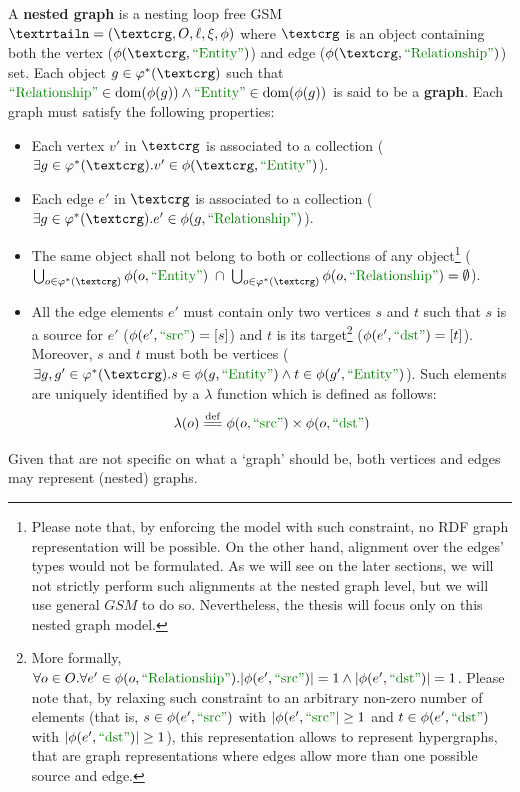 \begin{definition}
	A \textbf{nested graph} is a nesting loop free GSM $\fullnested$  where $\ngraph$ is an object containing both the vertex ($\phi(\ngraph,\ONTA)$) and edge ($\phi(\ngraph,\RELA)$) set. Each object $g\in \varphi^*(\ngraph)$ such that $\RELA\in\dom(\phi(g))\wedge \ONTA\in\dom(\phi(g))$ is said to be a \textbf{graph}. Each graph must satisfy the following properties:
	\begin{itemize}
		\item Each vertex $v'$ in $\ngraph$ is associated to a \ONTA collection ($\exists g\in\varphi^*(\ngraph). v'\in\phi(\ngraph,\ONTA)$).
		\item Each edge $e'$ in $\ngraph$ is associated to a \RELA collection ($\exists g\in\varphi^*(\ngraph).e'\in\phi(g,\RELA)$).
		\item  The same object shall not belong to both \ONTA or \RELA collections of any object\footnote{Please note that, by enforcing the model with such constraint, no RDF graph representation will be possible. On the other hand, alignment over the edges' types would not be formulated. As we will see on the later sections, we will not strictly perform such alignments at the nested graph level, but we will use general $GSM$ to do so. Nevertheless, the thesis will focus only on this nested graph model.} ($\bigcup_{o\in \varphi^*(\ngraph)}\phi(o,\ONTA)\;\cap\; \bigcup_{o\in \varphi^*(\ngraph)}\phi(o,\RELA)=\emptyset$).
		\item All the edge elements $e'$ must contain only two vertices $s$ and $t$ such that $s$ is a source for $e'$ ($\phi(e',\SRC)=[s]$) and $t$ is its target\footnote{More formally, $\forall o\in O.\forall e'\in\phi(o,\RELA).|\phi(e',\SRC)|=1\wedge |\phi(e',\DST)|=1$. Please note that, by relaxing such constraint to an arbitrary non-zero number of elements (that is, $s\in\phi(e',\SRC)$ with $|\phi(e',\SRC|\geq 1$ and $t\in\phi(e',\DST)$ with $|\phi(e',\DST)|\geq 1$), this representation allows to represent hypergraphs, that are graph representations where edges allow more than one possible source and edge.} ($\phi(e',\DST)=[t]$). Moreover, $s$ and $t$ must both be vertices ($\exists g,g'\in\varphi^*(\ngraph). s\in\phi(g,\ONTA)\wedge t\in\phi(g',\ONTA)$). Such elements are uniquely identified by a $\lambda$ function which is defined as follows:
		\[\lambda(o)\eqdef \phi(o,\SRC)\times\phi(o,\DST)\]
\end{itemize}
Given that are not specific on what a `graph' should be, both vertices and edges may represent (nested) graphs.
\end{definition}


